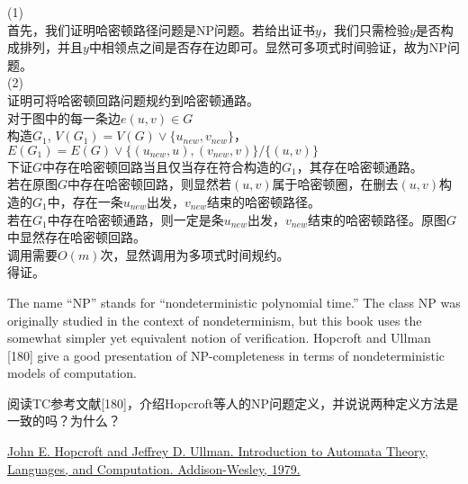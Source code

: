 \documentclass[a4paper, justified]{tufte-handout}
\begin{document}
\begin{solution}
  (1)\\
  首先，我们证明哈密顿路径问题是NP问题。若给出证书$y$，我们只需检验$y$是否构成排列，并且$y$中相领点之间是否存在边即可。显然可多项式时间验证，故为NP问题。\\
  (2)\\
  证明可将哈密顿回路问题规约到哈密顿通路。\\
  对于图中的每一条边$e(u,v)\in G$\\
  构造$G_1$, $V(G_1)=V(G)\lor \{u_{new}, v_{new}\}$，$E(G_1) = E(G)\lor\{(u_{new}, u), (v_{new}, v)\}/\{(u,v)\}$\\
  下证$G$中存在哈密顿回路当且仅当存在符合构造的$G_1$，其存在哈密顿通路。\\
  若在原图$G$中存在哈密顿回路，则显然若$(u,v)$属于哈密顿圈，在删去$(u,v)$构造的$G_1$中，存在一条$u_{new}$出发，$v_{new}$结束的哈密顿路径。\\
  若在$G_1$中存在哈密顿通路，则一定是条$u_{new}$出发，$v_{new}$结束的哈密顿路径。原图$G$中显然存在哈密顿回路。\\
  调用需要$O(m)$次，显然调用为多项式时间规约。\\
  得证。
\end{solution}
\beginoptional

\begin{problem}[TC 34.5-2]
\end{problem}

\begin{solution}
\end{solution}

\beginot
\begin{ot}[NP]
  The name ``NP'' stands for ``nondeterministic polynomial time.'' The class NP was originally studied	in the context of nondeterminism, but this book uses the somewhat simpler yet equivalent notion of verification.
  Hopcroft and Ullman [180] give a good presentation of NP-completeness in terms of nondeterministic models of computation.

  阅读TC参考文献[180]，介绍Hopcroft等人的NP问题定义，并说说两种定义方法是一致的吗？为什么？

  \href{http://ce.sharif.edu/courses/94-95/1/ce414-2/resources/root/Text\%20Books/Automata/John\%20E.\%20Hopcroft,\%20Rajeev\%20Motwani,\%20Jeffrey\%20D.\%20Ullman-Introduction\%20to\%20Automata\%20Theory,\%20Languages,\%20and\%20Computations-Prentice\%20Hall\%20(2006).pdf}{John E. Hopcroft and Jeffrey D. Ullman. Introduction to Automata Theory, Languages, and	Computation. Addison-Wesley, 1979.
  }
\end{ot}
\end{document}
